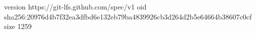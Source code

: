 version https://git-lfs.github.com/spec/v1
oid sha256:20976d4b7f32ea3dfbd6e132eb79ba4839926cb3d264d2b5e64664b38607c0cf
size 1259
